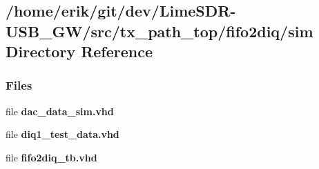 \subsection{/home/erik/git/dev/\+Lime\+S\+D\+R-\/\+U\+S\+B\+\_\+\+G\+W/src/tx\+\_\+path\+\_\+top/fifo2diq/sim Directory Reference}
\label{dir_26832ccbc63fa4c6113e2d42ed96bd2d}
\subsubsection*{Files}
\begin{DoxyCompactItemize}
\item 
file {\bf dac\+\_\+data\+\_\+sim.\+vhd}
\item 
file {\bf diq1\+\_\+test\+\_\+data.\+vhd}
\item 
file {\bf fifo2diq\+\_\+tb.\+vhd}
\end{DoxyCompactItemize}
